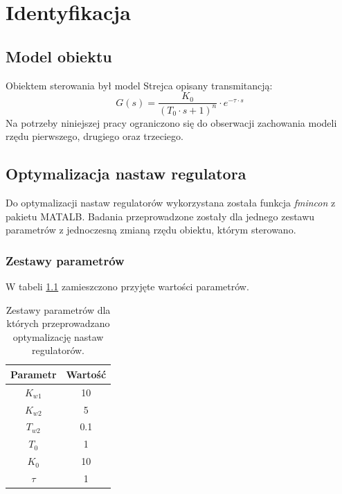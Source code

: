 \chapter{Identyfikacja}


\section{Model obiektu}

Obiektem sterowania był model Strejca opisany  transmitancją:
\begin{equation}\label{key}
G(s) = \dfrac{K_0}{(T_0 \cdot s + 1)^n} \cdot e^{-\tau \cdot s} 
\end{equation}
Na potrzeby niniejszej pracy ograniczono się do obserwacji zachowania modeli rzędu pierwszego, drugiego oraz trzeciego.
 
 
\section{Optymalizacja nastaw regulatora}

Do optymalizacji nastaw regulatorów wykorzystana została funkcja \textit{fmincon} z pakietu MATALB. Badania przeprowadzone zostały dla jednego zestawu parametrów z jednoczesną zmianą rzędu obiektu, którym sterowano.

\subsection{Zestawy parametrów}

W tabeli \ref{tab_par} zamieszczono przyjęte wartości parametrów.
\begin{table}[]
	\centering
	\caption{Zestawy parametrów dla których przeprowadzano optymalizację nastaw regulatorów.}
	\label{tab_par}
	\begin{tabular}{|c|c|} \hline
	Parametr & Wartość \\ \hline
	$K_{w1}$                                             & 10 \\ \hline
	$K_{w2}$                                                                                         & 5 \\ \hline
		$T_{w2}$                                                                                          & 0.1 \\ \hline
		$T_0$                                                                                             & 1 \\ \hline
		$K_0$                                                                                             & 10 \\ \hline
		$\tau$                                                                                            & 1 \\ \hline
	\end{tabular}
\end{table}


